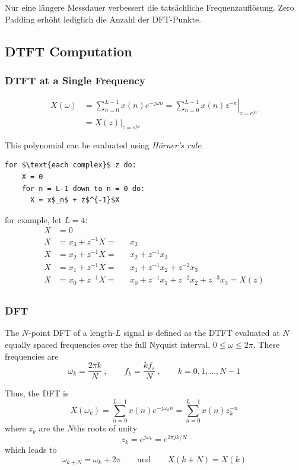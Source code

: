 Nur eine längere Messdauer verbessert die tatsächliche Frequenzauflösung.
Zero Padding erhöht lediglich die Anzahl der DFT-Punkte.

\subsection{DTFT Computation}

\subsubsection{DTFT at a Single Frequency}
\begin{align*}
X(\omega) & = \sum_{n=0}^{L-1}x(n)e^{-j\omega n}
 	  = \left.\sum_{n=0}^{L-1}x(n)z^{-n}\right|_{z=e^{j\omega}} \\
	& = \left. X(z)\right|_{z=e^{j\omega}}
\end{align*}

This polynomial can be evaluated using \emph{Hörner's rule}:
\begin{lstlisting}[mathescape]
for $\text{each complex}$ z do:
	X = 0
	for n = L-1 down to n = 0 do:
	  X = x$_n$ + z$^{-1}$X
\end{lstlisting}
for example, let $L=4$:
\begin{align*}
	X &= 0 \\
	X &= x_3+z^{-1}X = && x_3 \\
	X &= x_2+z^{-1}X = && x_2+z^{-1}x_3 \\
	X &= x_1+z^{-1}X = && x_1+z^{-1}x_2+z^{-2}x_3 \\
	X &= x_0+z^{-1}X = && x_0+z^{-1}x_1+z^{-2}x_2+z^{-3}x_3 = X(z) \\
\end{align*}

\subsubsection{DFT}
The $N$-point DFT of a length-$L$ signal is defined as the DTFT evaluated
at $N$ equally spaced frequencies over the full Nyquist interval,
$0 \leq \omega \leq 2 \pi$. These frequencies are
\begin{equation*}
	\omega_k = \frac{2 \pi k}{N}\:, \qquad f_k = \frac{k f_s}{N} \:,\qquad k=0,1,\ldots,N-1
\end{equation*}

Thus, the DFT is
\begin{equation*}
	X(\omega_k) = \sum\limits_{n=0}^{L-1} x(n) e^{-j\omega_kn} = \sum\limits_{n=0}^{L-1} x(n)z_k^{-n}
\end{equation*}
where $z_k$ are the $N$ths roots of unity
\begin{equation*}
	z_k = e^{j\omega_k} = e^{2\pi j k / N}
\end{equation*}
which leads to
\begin{equation*}
	\omega_{k+N} = \omega_k + 2 \pi \qquad \text{and} \qquad X(k+N) = X(k)
\end{equation*}

